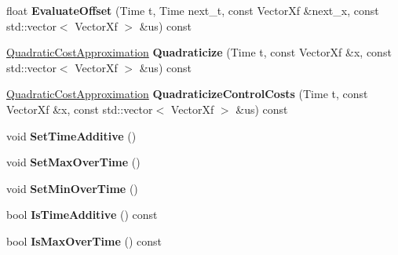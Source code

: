 \begin{DoxyCompactItemize}
\item 
float {\bfseries Evaluate\+Offset} (Time t, Time next\+\_\+t, const Vector\+Xf \&next\+\_\+x, const std\+::vector$<$ Vector\+Xf $>$ \&us) const \hypertarget{classilqgames_1_1_player_cost_a56bf9c10b7ffa6fbdfb1a9bff1ce65c3}{}\label{classilqgames_1_1_player_cost_a56bf9c10b7ffa6fbdfb1a9bff1ce65c3}

\item 
\hyperlink{structilqgames_1_1_quadratic_cost_approximation}{Quadratic\+Cost\+Approximation} {\bfseries Quadraticize} (Time t, const Vector\+Xf \&x, const std\+::vector$<$ Vector\+Xf $>$ \&us) const \hypertarget{classilqgames_1_1_player_cost_ad3962847f8eda8bcfecf2096e6abccb6}{}\label{classilqgames_1_1_player_cost_ad3962847f8eda8bcfecf2096e6abccb6}

\item 
\hyperlink{structilqgames_1_1_quadratic_cost_approximation}{Quadratic\+Cost\+Approximation} {\bfseries Quadraticize\+Control\+Costs} (Time t, const Vector\+Xf \&x, const std\+::vector$<$ Vector\+Xf $>$ \&us) const \hypertarget{classilqgames_1_1_player_cost_a1273b7fbbfc4cca818ebdcf6942662ba}{}\label{classilqgames_1_1_player_cost_a1273b7fbbfc4cca818ebdcf6942662ba}

\item 
void {\bfseries Set\+Time\+Additive} ()\hypertarget{classilqgames_1_1_player_cost_aabdacf36b0f3bc01b96ea1b62da9737a}{}\label{classilqgames_1_1_player_cost_aabdacf36b0f3bc01b96ea1b62da9737a}

\item 
void {\bfseries Set\+Max\+Over\+Time} ()\hypertarget{classilqgames_1_1_player_cost_ab348e49baf8f7e580914a17ce79f175e}{}\label{classilqgames_1_1_player_cost_ab348e49baf8f7e580914a17ce79f175e}

\item 
void {\bfseries Set\+Min\+Over\+Time} ()\hypertarget{classilqgames_1_1_player_cost_a00b0e84c89dfef9375d3ee17c9b8e4ef}{}\label{classilqgames_1_1_player_cost_a00b0e84c89dfef9375d3ee17c9b8e4ef}

\item 
bool {\bfseries Is\+Time\+Additive} () const \hypertarget{classilqgames_1_1_player_cost_a0a7a783fc2d25d16b20d8ecb232de147}{}\label{classilqgames_1_1_player_cost_a0a7a783fc2d25d16b20d8ecb232de147}

\item 
bool {\bfseries Is\+Max\+Over\+Time} () const \hypertarget{classilqgames_1_1_player_cost_a1a07ef47dadd7821b19357062d74ab79}{}\label{classilqgames_1_1_player_cost_a1a07ef47dadd7821b19357062d74ab79}


\end{DoxyCompactItemize}

